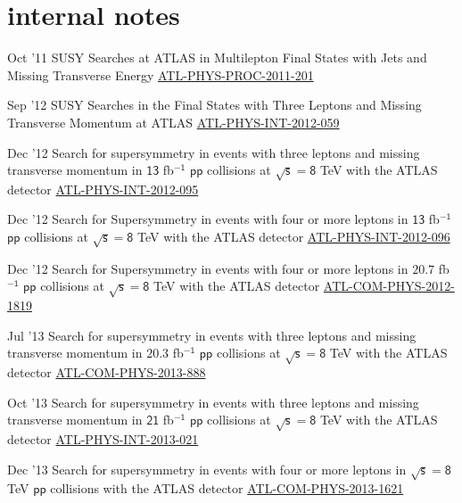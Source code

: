 \documentclass[]{cv} %
\begin{document}
\ifinternalNotes
\section{internal notes}
\begin{entrylist}

\entry
{Oct '11}
{{\normalfont SUSY Searches at ATLAS in Multilepton Final States with Jets and Missing Transverse Energy}}
{\href{https://cds.cern.ch/record/1394331}{ATL-PHYS-PROC-2011-201}}
{\vspace*{-8pt}}

\entry
{Sep '12}
{{\normalfont SUSY Searches in the Final States with Three Leptons and Missing Transverse Momentum at ATLAS}}
{\href{https://cds.cern.ch/record/1482141}{ATL-PHYS-INT-2012-059}}
{\vspace*{-8pt}}

\entry
{Dec '12}
{{\normalfont Search for supersymmetry in events with three leptons and missing transverse momentum in $\mathsf{13}$ fb$^{\mathsf{-1}}$ $\mathsf{pp}$ collisions
at $\sqrt{\mathsf{s}} = \mathsf{8}$ TeV with the ATLAS detector}}
{\href{https://cds.cern.ch/record/1498390}{ATL-PHYS-INT-2012-095}}
{\vspace*{-8pt}}

\entry
{Dec '12}
{{\normalfont Search for Supersymmetry in events with four or more leptons in $\mathsf{13}$ fb$^{\mathsf{-1}}$ $\mathsf{pp}$ collisions at $\sqrt{\mathsf{s}} =
\mathsf{8}$ TeV with the ATLAS detector}}
{\href{https://cds.cern.ch/record/1498627}{ATL-PHYS-INT-2012-096}}
{\vspace*{-8pt}}

\entry
{Dec '12}
{{\normalfont Search for Supersymmetry in events with four or more leptons in $\mathsf{20.7}$ fb$^{\mathsf{-1}}$ $\mathsf{pp}$ collisions at $\sqrt{\mathsf{s}}
= \mathsf{8}$ TeV with the ATLAS detector}}
{\href{https://cds.cern.ch/record/1501709}{ATL-COM-PHYS-2012-1819}}
{\vspace*{-8pt}}

\entry
{Jul '13}
{{\normalfont Search for supersymmetry in events with three leptons and missing transverse momentum in $\mathsf{20.3}$ fb$^{\mathsf{-1}}$ $\mathsf{pp}$
collisions at $\sqrt{\mathsf{s}} = \mathsf{8}$ TeV with the ATLAS detector}}
{\href{https://cds.cern.ch/record/1558985}{ATL-COM-PHYS-2013-888}}
{\vspace*{-8pt}}

\entry
{Oct '13}
{{\normalfont Search for supersymmetry in events with three leptons and missing transverse momentum in $\mathsf{21}$ fb$^{\mathsf{-1}}$ $\mathsf{pp}$ collisions
at $\sqrt{\mathsf{s}} = \mathsf{8}$ TeV with the ATLAS detector}}
{\href{https://cds.cern.ch/record/1610185}{ATL-PHYS-INT-2013-021}}
{\vspace*{-8pt}}

\entry
{Dec '13}
{{\normalfont Search for supersymmetry in events with four or more leptons in $\sqrt{\mathsf{s}} = \mathsf{8}$ TeV $\mathsf{pp}$ collisions with the ATLAS
detector}}
{\href{https://cds.cern.ch/record/1635455}{ATL-COM-PHYS-2013-1621}}
{\vspace*{-8pt}}

\end{entrylist}
\fi
\end{document}
